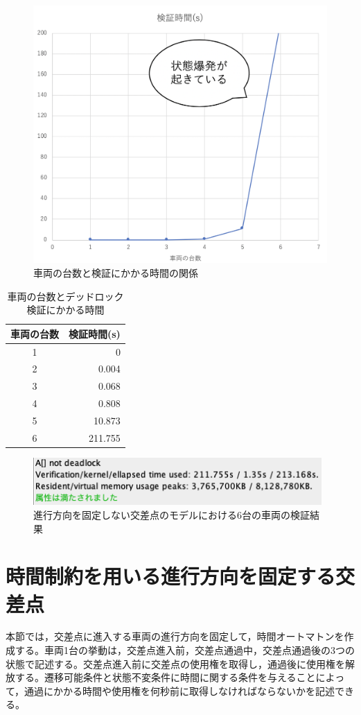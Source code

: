\documentclass{tpu-sotu}
\begin{document}
	\begin{figure}[htbp]
	\centering
	\includegraphics[width=120mm]{IntersectionVerificationTime.png}
	\caption{車両の台数と検証にかかる時間の関係}
	\label{IVT}
	\end{figure}
	\begin{table}[htb]
	\centering
	\caption{車両の台数とデッドロック検証にかかる時間}
	 \begin{tabular}{|c|r|} \hline
	    車両の台数 & 検証時間(s)  \\ \hline
	   1& 0  \\ \hline
	   2 & 0.004 \\ \hline
	   3 & 0.068 \\ \hline
	   4 & 0.808 \\ \hline
	   5 & 10.873 \\ \hline
	   6 & 211.755 \\ \hline
	 \end{tabular}
	 \label{testcase}
	\end{table}

	\begin{figure}[htbp]
	\centering
	\includegraphics[width=110mm]{InterBigCar6.png}
	\caption{進行方向を固定しない交差点のモデルにおける6台の車両の検証結果}
	\label{IBC6}
	\end{figure}

	
	\section{時間制約を用いる進行方向を固定する交差点}
	本節では，交差点に進入する車両の進行方向を固定して，時間オートマトン\cite{u3}を作成する。車両1台の挙動は，交差点進入前，交差点通過中，交差点通過後の3つの状態で記述する。交差点進入前に交差点の使用権を取得し，通過後に使用権を解放する。遷移可能条件と状態不変条件に時間に関する条件を与えることによって，通過にかかる時間や使用権を何秒前に取得しなければならないかを記述できる。
\end{document}
